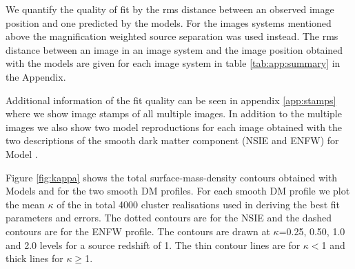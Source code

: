 \documentclass[useAMS,usenatbib]{mn2e}
\newcounter{one}   \setcounter{one}{1}
\newcounter{two}   \setcounter{two}{2}
\begin{document}
We quantify the quality of fit by the rms distance between an observed
image position and one predicted by the models. For the images systems
mentioned above the magnification weighted source separation was used
instead. The rms distance between an image in an image system and the
image position obtained with the models are given for each image
system in table \ref{tab:app:summary} in the Appendix.

Additional information of the fit quality can be seen in appendix
\ref{app:stamps} where we show image stamps of all multiple images. In
addition to the multiple images we also show two model reproductions
for each image obtained with the two descriptions of the smooth dark
matter component (NSIE and ENFW) for Model .

Figure \ref{fig:kappa} shows the total surface-mass-density
contours obtained with Models  and  for the two
smooth DM profiles. For each smooth DM profile we plot the mean
$\kappa$ of the in total 4000 cluster realisations used in deriving
the best fit parameters and errors. The dotted contours are for the
NSIE and the dashed contours are for the ENFW profile. The contours
are drawn at $\kappa$=0.25, 0.50, 1.0 and 2.0 levels for a source
redshift of 1. The thin contour lines are for $\kappa<$1 and thick
lines for $\kappa\ge$1.\\
\end{document}
